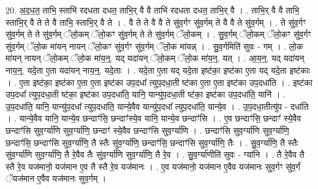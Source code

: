 \documentclass[17pt]{extarticle}
\begin{document}
20. अ॒द॒ध॒त॒ ताभि॒ स्ताभि॑ रदधता दधत॒ ताभि॒र् वै वै ताभि॑ रदधता दधत॒ ताभि॒र् वै । . ताभि॒र् वै वै ताभि॒ स्ताभि॒र् वै ते ते वै ताभि॒ स्ताभि॒र् वै ते । . वै ते ते वै वै ते सु॑व॒र्गꣳ सु॑व॒र्गम् ते वै वै ते सु॑व॒र्गम् । . ते सु॑व॒र्गꣳ सु॑व॒र्गम् ते ते सु॑व॒र्गम् ॅलो॒कम् ॅलो॒कꣳ सु॑व॒र्गम् ते ते सु॑व॒र्गम् ॅलो॒कम् । . सु॒व॒र्गम् ॅलो॒कम् ॅलो॒कꣳ सु॑व॒र्गꣳ सु॑व॒र्गम् ॅलो॒क मा॑यन् नायन् ॅलो॒कꣳ सु॑व॒र्गꣳ सु॑व॒र्गम् ॅलो॒क मा॑यन्न् । . सु॒व॒र्गमिति॑ सुवः - गम् । . लो॒क मा॑यन् नायन् ॅलो॒कम् ॅलो॒क मा॑य॒न्॒. यद् यदा॑यन् ॅलो॒कम् ॅलो॒क मा॑य॒न्॒. यत् । . आ॒य॒न्॒. यद् यदा॑यन् नाय॒न्॒. यदे॒ता ए॒ता यदा॑यन् नाय॒न्॒. यदे॒ताः । . यदे॒ता ए॒ता यद् यदे॒ता इष्ट॑का॒ इष्ट॑का ए॒ता यद् यदे॒ता इष्ट॑काः । . ए॒ता इष्ट॑का॒ इष्ट॑का ए॒ता ए॒ता इष्ट॑का उप॒दधा᳚ त्युप॒दधा॒ती ष्ट॑का ए॒ता ए॒ता इष्ट॑का उप॒दधा॑ति । . इष्ट॑का उप॒दधा᳚ त्युप॒दधा॒ती ष्ट॑का॒ इष्ट॑का उप॒दधा॑ति॒ यानि॒ यान्यु॑प॒दधा॒ती ष्ट॑का॒ इष्ट॑का उप॒दधा॑ति॒ यानि॑ । . उ॒प॒दधा॑ति॒ यानि॒ यान्यु॑प॒दधा᳚ त्युप॒दधा॑ति॒ यान्ये॒वैव यान्यु॑प॒दधा᳚ त्युप॒दधा॑ति॒ यान्ये॒व । . उ॒प॒दधा॒तीत्यु॑प - दधा॑ति । . यान्ये॒वैव यानि॒ यान्ये॒व छन्दाꣳ॑सि॒ छन्दाꣳ॑स्ये॒व यानि॒ यान्ये॒व छन्दाꣳ॑सि । . ए॒व छन्दाꣳ॑सि॒ छन्दाꣳ॑ स्ये॒वैव छन्दाꣳ॑सि सुव॒र्ग्या॑णि सुव॒र्ग्या॑णि॒ छन्दाꣳ॑ स्ये॒वैव छन्दाꣳ॑सि सुव॒र्ग्या॑णि । . छन्दाꣳ॑सि सुव॒र्ग्या॑णि सुव॒र्ग्या॑णि॒ छन्दाꣳ॑सि॒ छन्दाꣳ॑सि सुव॒र्ग्या॑णि॒ तै स्तैः सु॑व॒र्ग्या॑णि॒ छन्दाꣳ॑सि॒ छन्दाꣳ॑सि सुव॒र्ग्या॑णि॒ तैः । . सु॒व॒र्ग्या॑णि॒ तै स्तैः सु॑व॒र्ग्या॑णि सुव॒र्ग्या॑णि॒ तै रे॒वैव तैः सु॑व॒र्ग्या॑णि सुव॒र्ग्या॑णि॒ तै रे॒व । . सु॒व॒र्ग्या॑णीति॑ सुवः - ग्या॑नि । . तै रे॒वैव तै स्तै रे॒व यज॑मानो॒ यज॑मान ए॒व तै स्तै रे॒व यज॑मानः । . ए॒व यज॑मानो॒ यज॑मान ए॒वैव यज॑मानः सुव॒र्गꣳ सु॑व॒र्गं ॅयज॑मान ए॒वैव यज॑मानः सुव॒र्गम् । \newline
\end{document}
